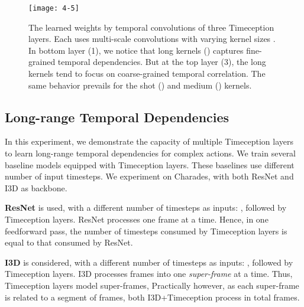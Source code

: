 \documentclass[10pt,twocolumn,letterpaper]{article}
\newcommand{\partitle}[1]{\noindent\textbf{#1}}
\begin{document}
\begin{figure*}[!ht]
\begin{center}
\texttt{[image: 4-5]}
\end{center}
\caption{The learned weights by temporal convolutions of three Timeception layers. Each uses multi-scale convolutions with varying kernel sizes . In bottom layer (1), we notice that long kernels () captures fine-grained temporal dependencies. But at the top layer (3), the long kernels tend to focus on coarse-grained temporal correlation. The same behavior prevails for the shot () and medium () kernels.}
\label{fig:4-5}
\vspace*{-5mm}
\end{figure*}

\subsection{Long-range Temporal Dependencies}
In this experiment, we demonstrate the capacity of multiple Timeception layers to learn long-range temporal dependencies for complex actions.
We train several baseline models equipped with Timeception layers. These baselines use different number of input timesteps.
We experiment on Charades, with both ResNet and I3D as backbone.

\partitle{ResNet} is used, with a different number of timesteps as inputs: , followed by Timeception layers.
ResNet processes one frame at a time.
Hence, in one feedforward pass, the number of timesteps consumed by Timeception layers is equal to that consumed by ResNet.

\partitle{I3D} is considered, with a different number of timesteps as inputs: , followed by Timeception layers.
I3D processes  frames into one \textit{super-frame} at a time.
Thus, Timeception layers model  super-frames, Practically however, as each super-frame is related to a segment of  frames, both I3D+Timeception process in total  frames.
\end{document}
